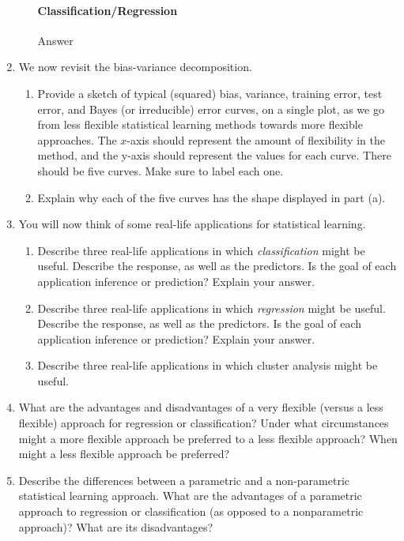 \documentclass[12pt]{article}
\begin{document}
\begin{enumerate}
\begin{enumerate}
    \paragraph{Classification/Regression} Answer
  \end{enumerate}
\item We now revisit the bias-variance decomposition.
  \begin{enumerate}
    \item Provide a sketch of typical (squared) bias, variance, training error,
          test error, and Bayes (or irreducible) error curves, on a single plot,
          as we go from less flexible statistical learning methods towards more
          flexible approaches. The $x$-axis should represent the amount of
          flexibility in the method, and the y-axis should represent the values
          for each curve. There should be five curves. Make sure to label each one.
    \item Explain why each of the five curves has the shape displayed in part (a).
  \end{enumerate}
\item You will now think of some real-life applications for statistical learning.
  \begin{enumerate}
    \item Describe three real-life applications in which \textit{classification}
          might be useful. Describe the response, as well as the predictors. Is
          the goal of each application inference or prediction? Explain your answer.
    \item Describe three real-life applications in which \textit{regression} might
          be useful. Describe the response, as well as the predictors. Is the goal
          of each application inference or prediction? Explain your answer.
    \item Describe three real-life applications in which cluster analysis might
          be useful.
  \end{enumerate}
\item What are the advantages and disadvantages of a very flexible (versus a less
      flexible) approach for regression or classification? Under what circumstances
      might a more flexible approach be preferred to a less flexible approach?
      When might a less flexible approach be preferred?

\item Describe the differences between a parametric and a non-parametric statistical
      learning approach. What are the advantages of a parametric approach to regression
      or classification (as opposed to a nonparametric approach)? What are its
      disadvantages?


\end{enumerate}
\end{document}

